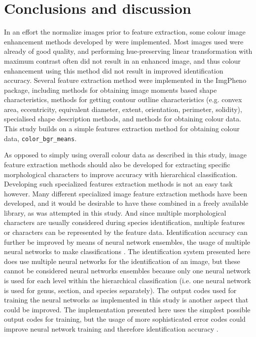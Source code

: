 \documentclass[twocolumn]{bmcart}
\begin{document}
\section{Conclusions and discussion}
\label{sect:conclusion}

In an effort the normalize images prior to feature extraction, some colour image enhancement methods developed by \cite{Naik2003} were implemented. Most images used were already of good quality, and performing hue-preserving linear transformation with maximum contrast often did not result in an enhanced image, and thus colour enhancement using this method did not result in improved identification accuracy. Several feature extraction method were implemented in the ImgPheno package, including methods for obtaining image moments based shape characteristics, methods for getting contour outline characteristics (e.g. convex area, eccentricity, equivalent diameter, extent, orientation, perimeter, solidity), specialised shape description methods, and methods for obtaining colour data. This study builds on a simple features extraction method for obtaining colour data, \verb/color_bgr_means/.

As opposed to simply using overall colour data as described in this study, image feature extraction methods should also be developed for extracting specific morphological characters to improve accuracy with hierarchical classification. Developing such specialized features extraction methods is not an easy task however. Many different specialized image feature extraction methods have been developed, and it would be desirable to have these combined in a freely available library, as was attempted in this study. And since multiple morphological characters are usually considered during species identification, multiple features or characters can be represented by the feature data. Identification accuracy can further be improved by means of neural network ensembles, the usage of multiple neural networks to make classifications \cite{Hansen1990}. The identification system presented here does use multiple neural networks for the identification of an image, but these cannot be considered neural networks ensembles because only one neural network is used for each level within the hierarchical classification (i.e. one neural network is used for genus, section, and species separately). The output codes used for training the neural networks as implemented in this study is another aspect that could be improved. The implementation presented here uses the simplest possible output codes for training, but the usage of more sophisticated error codes could improve neural network training and therefore identification accuracy \cite{Dietterich1995}.
\end{document}

